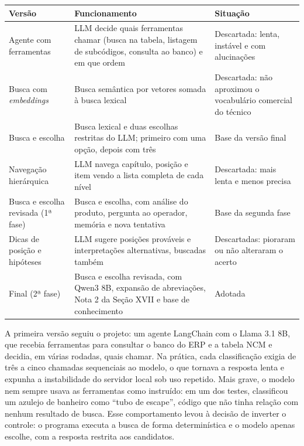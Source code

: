 \begin{quadro}[H]
\centering
\caption{Versões do processo de sugestão avaliadas}
\label{qua:versoes}
\begin{tabular}{|p{3.3cm}|p{6.2cm}|p{4.7cm}|}
\hline
\textbf{Versão} & \textbf{Funcionamento} & \textbf{Situação} \\
\hline
Agente com ferramentas & LLM decide quais ferramentas chamar (busca na tabela, listagem de subcódigos, consulta ao banco) e em que ordem & Descartada: lenta, instável e com alucinações \\
\hline
Busca com \textit{embeddings} & Busca semântica por vetores somada à busca lexical & Descartada: não aproximou o vocabulário comercial do técnico \\
\hline
Busca e escolha & Busca lexical e duas escolhas restritas do LLM; primeiro com uma opção, depois com três & Base da versão final \\
\hline
Navegação hierárquica & LLM navega capítulo, posição e item vendo a lista completa de cada nível & Descartada: mais lenta e menos precisa \\
\hline
Busca e escolha revisada (1ª fase) & Busca e escolha, com análise do produto, pergunta ao operador, memória e nova tentativa & Base da segunda fase \\
\hline
Dicas de posição e hipóteses & LLM sugere posições prováveis e interpretações alternativas, buscadas também & Descartadas: pioraram ou não alteraram o acerto \\
\hline
Final (2ª fase) & Busca e escolha revisada, com Qwen3 8B, expansão de abreviações, Nota 2 da Seção XVII e base de conhecimento & Adotada \\
\hline
\end{tabular}
\end{quadro}

A primeira versão seguiu o projeto: um agente LangChain com o Llama 3.1 8B, que recebia ferramentas para consultar o banco do ERP e a tabela NCM e decidia, em várias rodadas, quais chamar. Na prática, cada classificação exigia de três a cinco chamadas sequenciais ao modelo, o que tornava a resposta lenta e expunha a instabilidade do servidor local sob uso repetido. Mais grave, o modelo nem sempre usava as ferramentas como instruído: em um dos testes, classificou um azulejo de banheiro como ``tubo de escape'', código que não tinha relação com nenhum resultado de busca. Esse comportamento levou à decisão de inverter o controle: o programa executa a busca de forma determinística e o modelo apenas escolhe, com a resposta restrita aos candidatos.

